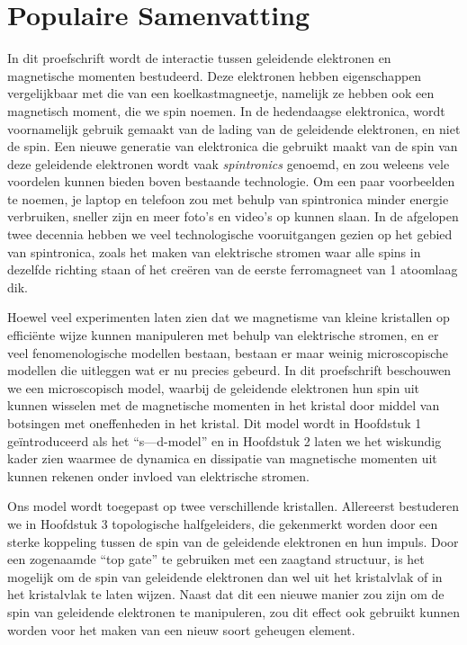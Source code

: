 \manualmark
{}%
%
%
\chapter*{Populaire Samenvatting}%
In dit proefschrift wordt de interactie tussen geleidende elektronen en magnetische momenten bestudeerd. Deze elektronen hebben eigenschappen vergelijkbaar met die van een koelkastmagneetje, namelijk ze hebben ook een magnetisch moment, die we spin noemen. In de hedendaagse elektronica, wordt voornamelijk gebruik gemaakt van de lading van de geleidende elektronen, en niet de spin. Een nieuwe generatie van elektronica die gebruikt maakt van de spin van deze geleidende elektronen wordt vaak \emph{spintronics} genoemd, en zou weleens vele voordelen kunnen bieden boven bestaande technologie. Om een paar voorbeelden te noemen, je laptop en telefoon zou met behulp van spintronica minder energie verbruiken, sneller zijn en meer foto's en video's op kunnen slaan. In de afgelopen twee decennia hebben we veel technologische vooruitgangen gezien op het gebied van spintronica, zoals het maken van elektrische stromen waar alle spins in dezelfde richting staan of het creëren van de eerste ferromagneet van 1 atoomlaag dik. 

Hoewel veel experimenten laten zien dat we magnetisme van kleine kristallen op efficiënte wijze kunnen manipuleren met behulp van elektrische stromen, en er veel fenomenologische modellen bestaan, bestaan er maar weinig microscopische modellen die uitleggen wat er nu precies gebeurd. In dit proefschrift beschouwen we een microscopisch model, waarbij de geleidende elektronen hun spin uit kunnen wisselen met de magnetische momenten in het kristal door middel van botsingen met oneffenheden in het kristal. Dit model wordt in Hoofdstuk 1 geïntroduceerd als het “s—d-model” en in Hoofdstuk 2 laten we het wiskundig kader zien waarmee de dynamica en dissipatie van magnetische momenten uit kunnen rekenen onder invloed van elektrische stromen. 

Ons model wordt toegepast op twee verschillende kristallen. Allereerst bestuderen we in Hoofdstuk 3 topologische halfgeleiders, die gekenmerkt worden door een sterke koppeling tussen de spin van de geleidende elektronen en hun impuls. Door een zogenaamde “top gate” te gebruiken met een zaagtand structuur, is het mogelijk om de spin van geleidende elektronen dan wel uit het kristalvlak of in het kristalvlak te laten wijzen. Naast dat dit een nieuwe manier zou zijn om de spin van geleidende elektronen te manipuleren, zou dit effect ook gebruikt kunnen worden voor het maken van een nieuw soort geheugen element. 

